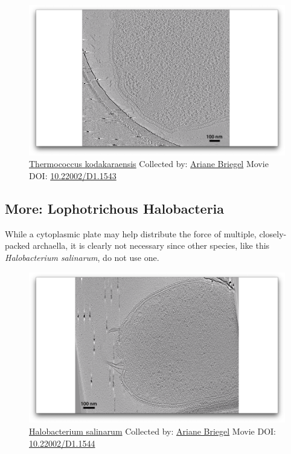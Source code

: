 \documentclass[]{tufte-book}
\begin{document}
\begin{figure}
\includegraphics{movie_stills/6_9b} \caption[\protect\hyperlink{tree}{Thermococcus kodakaraensis}
Collected by: \protect\hyperlink{ariane_briegel}{Ariane Briegel} Movie
DOI: \href{https://doi.org/10.22002/D1.1543}{10.22002/D1.1543}]{\protect\hyperlink{tree}{Thermococcus kodakaraensis}
Collected by: \protect\hyperlink{ariane_briegel}{Ariane Briegel} Movie
DOI: \href{https://doi.org/10.22002/D1.1543}{10.22002/D1.1543}}\label{fig:6-9b}
\end{figure}

\hypertarget{Lophotrichous_Halobacteria}{\subsection*{More:
Lophotrichous Halobacteria}\label{Lophotrichous_Halobacteria}}

While a cytoplasmic plate may help distribute the force of multiple,
closely-packed archaella, it is clearly not necessary since other
species, like this \emph{Halobacterium salinarum}, do not use one.





\begin{figure}
\includegraphics{movie_stills/6_9c} \caption[\protect\hyperlink{tree}{Halobacterium salinarum} Collected
by: \protect\hyperlink{ariane_briegel}{Ariane Briegel} Movie DOI:
\href{https://doi.org/10.22002/D1.1544}{10.22002/D1.1544}]{\protect\hyperlink{tree}{Halobacterium salinarum} Collected
by: \protect\hyperlink{ariane_briegel}{Ariane Briegel} Movie DOI:
\href{https://doi.org/10.22002/D1.1544}{10.22002/D1.1544}}\label{fig:6-9c}
\end{figure}
\end{document}
